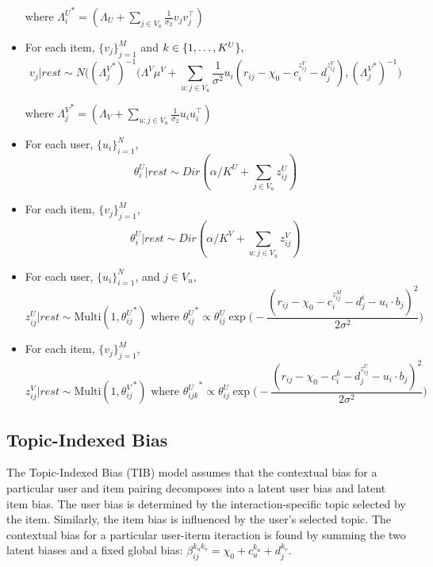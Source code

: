 \documentclass{article}
\begin{document}
\begin{itemize}
where ${\Lambda_i^U}^* = (\Lambda_U + \sum_{j \in V_u} \frac{1}{\sigma_2} v_j v_j^\top)$

\item For each item, $\{v_j\}_{j=1}^M$ and $k \in \{1,\ldots, K^U\}, \\$
    $$v_j | rest \sim N \Bigg(({\Lambda_j^V}^*)^{-1} (\Lambda^V \mu^V + \sum_{u: j \in V_u} \frac{1}{\sigma^2} u_i(r_{ij} - \chi_0 - c_i^{z_{ij}^V} - d_j^{z_{ij}^V}), ({\Lambda_j^V}^*)^{-1} \Bigg)$$

where ${\Lambda_j^V}^* = (\Lambda_V + \sum_{u: j \in V_u} \frac{1}{\sigma_2} u_i u_i^\top)$

\item For each user, $\{u_i\}_{i=1}^N$, \\
    $$\theta_i^U | rest \sim Dir(\alpha/K^U + \sum_{j \in V_u} z_{ij}^U) $$
\item For each item, $\{v_j\}_{j=1}^M$, \\
    $$\theta_i^U | rest \sim Dir(\alpha/K^V + \sum_{u: j \in V_u} z_{ij}^V)$$
\item For each user, $\{u_i\}_{i=1}^N$, and $j \in V_u$, \\
    $$z_{ij}^U | rest \sim \text{Multi}(1, {\theta_{ij}^U}^*) 
    \text{ where } {\theta_{ij}^U}^* \propto \theta_{ij}^U \exp\Bigg(-\frac{(r_{ij} - \chi_0 - c_i^{z_{ij}^M} - d_j^i - u_i \cdot b_j)^2}{2 \sigma^2} \Bigg)$$

\item For each item, $\{v_j\}_{j=1}^M$, \\
    $$z_{ij}^V | rest \sim \text{Multi}(1, {\theta_{ij}^V}^*)
    \text{ where }{\theta_{ijk}^U}^* \propto \theta_{ij}^U \exp\Bigg(-\frac{(r_{ij} - \chi_0 - c_i^k - d_j^{z_{ij}^U} - u_i \cdot b_j)^2}{2 \sigma^2} \Bigg)$$
\end{itemize}

\subsection{Topic-Indexed Bias}
The Topic-Indexed Bias (TIB) model assumes that the contextual bias for a particular user and item pairing decomposes into a latent user bias and latent item bias. The user bias is determined by the interaction-specific topic selected by the item. Similarly, the item bias is influenced by the user's selected topic. The contextual bias for a particular user-iterm iteraction is found by summing the two latent biases and a fixed global bias: $\beta_{ij}^{k_u k_v} = \chi_0 + c_u^{k_u} + d_j^{k_v}$.
\end{document}
